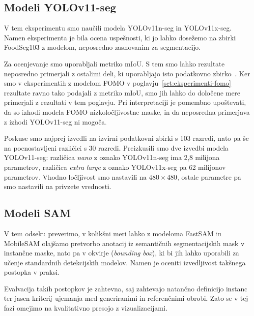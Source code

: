 \documentclass[a4paper,twoside,openright,12pt,slovene]{book}
\begin{document}
        \subsection{Modeli YOLOv11-seg} \label{sct:eir-eksperimenti-yolov11}

            V tem eksperimentu smo naučili modela YOLOv11n-seg in YOLOv11x-seg.
            Namen eksperimenta je bila ocena uspešnosti, ki jo lahko dosežemo
            na zbirki FoodSeg103 z modelom, neposredno zasnovanim za
            segmentacijo.

            Za ocenjevanje smo uporabljali metriko mIoU. S tem smo lahko
            rezultate neposredno primerjali z ostalimi deli, ki uporabljajo
            isto podatkovno zbirko~\cite{src:wu2021large}. Ker smo v
            eksperimentih z modelom FOMO v poglavju~\ref{sct:eksperimenti-fomo}
            rezultate ravno tako podajali z
            metriko mIoU, smo jih lahko do določene mere primerjali z rezultati
            v tem poglavju. Pri interpretaciji je pomembno upoštevati, da so
            izhodi modela FOMO nizkoločljivostne maske, in da neposredna
            primerjava z izhodi YOLOv11-seg ni mogoča.

            Poskuse smo najprej izvedli na izvirni podatkovni zbirki s 103
            razredi, nato pa še na poenostavljeni različici s 30 razredi.
            Preizkusili smo dve izvedbi modela YOLOv11-seg: različica
            \emph{nano} z oznako YOLOv11n-seg ima 2,8 milijona parametrov,
            različica \emph{extra large} z oznako YOLOv11x-seg pa 62 milijonov
            parametrov. Vhodno ločljivost smo nastavili na \(480 \times 480\),
            ostale parametre pa smo nastavili na privzete vrednosti.

        \subsection{Modeli SAM} \label{sct:rezultati-sam}
            
            V tem odseku preverimo, v kolikšni meri lahko z modeloma FastSAM in
            MobileSAM olajšamo pretvorbo anotacij iz semantičnih
            segmentacijskih mask v instančne maske, nato pa v okvirje
            (\emph{bounding box}), ki bi jih lahko uporabili za učenje
            standardnih detekcijskih modelov. Namen je oceniti izvedljivost
            takšnega postopka v praksi.
            
            Evalvacija takih postopkov je zahtevna, saj zahtevajo natančno
            definicijo instanc ter jasen kriterij ujemanja med generiranimi in
            referenčnimi obrobi. Zato se v tej fazi omejimo na kvalitativno
            presojo z vizualizacijami.
            
\end{document}
